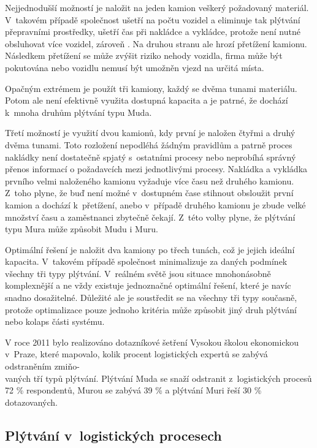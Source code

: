 Nejjednodušší možností je naložit na jeden kamion veškerý požadovaný materiál. V~takovém případě společnost ušetří na počtu vozidel a eliminuje tak plýtvání přepravními prostředky, ušetří čas při nakládce a vykládce, protože není nutné obsluhovat více vozidel, zároveň . Na druhou stranu ale hrozí přetížení kamionu. Následkem přetížení se může zvýšit riziko nehody vozidla, firma může být pokutována nebo vozidlu nemusí být umožněn vjezd na určitá místa.

Opačným extrémem je použít tři kamiony, každý se dvěma tunami materiálu. Potom ale není efektivně využita dostupná kapacita a je patrné, že dochází k~mnoha druhům plýtvání typu Muda.

Třetí možností je využití dvou kamionů, kdy první je naložen čtyřmi a druhý dvěma tunami. Toto rozložení nepodléhá žádným pravidlům a patrně proces nakládky není dostatečně spjatý s~ostatními procesy nebo neprobíhá správný přenos informací o požadavcích mezi jednotlivými procesy. Nakládka a vykládka prvního velmi naloženého kamionu vyžaduje více času než druhého kamionu. Z~toho plyne, že buď není možné v~dostupném čase stihnout obsloužit první kamion a dochází k~přetížení, anebo v~případě druhého kamionu je zbude velké množství času a zaměstnanci zbytečně čekají. Z~této volby plyne, že plýtvání typu Mura může způsobit Mudu i Muru.\cite{bib:LW3}

Optimální řešení je naložit dva kamiony po třech tunách, což je jejich ideální kapacita. V~takovém případě společnost minimalizuje za daných podmínek všechny tři typy plýtvání. V~reálném světě jsou situace mnohonásobně komplexnější a ne vždy existuje jednoznačné optimální řešení, které je navíc snadno dosažitelné. Důležité ale je soustředit se na všechny tři typy současně, protože optimalizace pouze jednoho kritéria může způsobit jiný druh plýtvání nebo kolaps části systému. 

V roce 2011 bylo realizováno dotazníkové šetření Vysokou školou ekonomickou v~Praze, které mapovalo, kolik procent logistických expertů se zabývá odstraněním zmiňo-\\vaných tří typů plýtvání. Plýtvání Muda se snaží odstranit z~logistických procesů 72 \% respondentů, Murou se zabývá 39 \% a plýtvání Muri řeší 30 \% dotazovaných.\cite{bib:Jirsak}

\subsection{Plýtvání v~logistických procesech}

